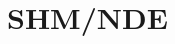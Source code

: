\documentclass[10pt,aspectratio=169,dvipsnames]{beamer} %
\begin{document}
	\section{SHM/NDE}
\end{document}
